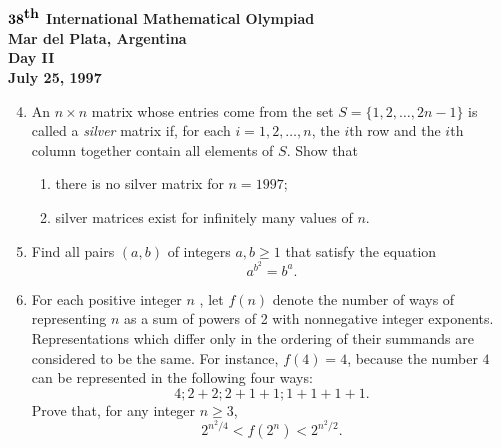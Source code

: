 \documentclass[12pt]{article}
\begin{document}
\pagebreak %
\begin{center}
${\bf 38}^{\mbox{\bf th}}$ {\bf International
Mathematical Olympiad} \\[.1in]
{\bf Mar del Plata, Argentina} \\ [.05in]
{\bf Day II}\\[.05in]
{\bf July 25, 1997}
\end{center}

\vspace*{.3in}

\begin{enumerate}
\setcounter{enumi}{3}
\item %

An $n \times n$ matrix whose entries come from the set $S = \{1, 2,
\dots, 2n-1\}$ is called a \emph{silver} matrix if, for each $i=1, 2,
\dots, n$, the $i$th row and the $i$th column together contain all
elements of $S$. Show that
\begin{enumerate}
\item
there is no silver matrix for $n = 1997$; 
\item
silver matrices exist for infinitely many values of $n$. 
\end{enumerate}

\item %
Find all pairs $(a,b)$ of integers $a, b \geq 1$ that satisfy the equation 
\[
a^{b^2} = b^a.
\]

\item %

For each positive integer $n$ , let $f(n)$ denote the number of ways
of representing $n$ as a
sum of powers of 2 with nonnegative integer exponents.
Representations which differ only in the ordering of their summands are considered to
be the same. For instance, $f(4)=4$, because the number $4$ can be represented in the
following four ways:
\[
                       4; 2+2; 2+1+1; 1+1+1+1. 
\]
Prove that, for any integer $n \geq 3$, 
\[
2^{n^2/4} < f(2^n) < 2^{n^2/2}.
\]

\end{enumerate}
\end{document}
